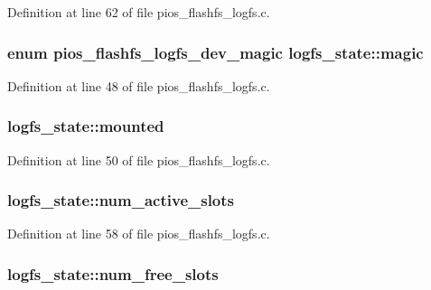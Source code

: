 Definition at line 62 of file pios\-\_\-flashfs\-\_\-logfs.\-c.

\hypertarget{structlogfs__state_acbcddf457808c9af84d6441f4f34be1e}{
\subsubsection[{magic}]{\setlength{\rightskip}{0pt plus 5cm}enum {\bf pios\-\_\-flashfs\-\_\-logfs\-\_\-dev\-\_\-magic} logfs\-\_\-state\-::magic}}\label{structlogfs__state_acbcddf457808c9af84d6441f4f34be1e}


Definition at line 48 of file pios\-\_\-flashfs\-\_\-logfs.\-c.

\hypertarget{structlogfs__state_a5d12393331e2e5d7d9141f4437e09ccf}{
\subsubsection[{mounted}]{ logfs\-\_\-state\-::mounted}}\label{structlogfs__state_a5d12393331e2e5d7d9141f4437e09ccf}


Definition at line 50 of file pios\-\_\-flashfs\-\_\-logfs.\-c.

\hypertarget{structlogfs__state_a9606319a5f23b1dee579106c84bf198b}{
\subsubsection[{num\-\_\-active\-\_\-slots}]{ logfs\-\_\-state\-::num\-\_\-active\-\_\-slots}}\label{structlogfs__state_a9606319a5f23b1dee579106c84bf198b}


Definition at line 58 of file pios\-\_\-flashfs\-\_\-logfs.\-c.

\hypertarget{structlogfs__state_a3c61a652819a886351af3431c8fe2061}{
\subsubsection[{num\-\_\-free\-\_\-slots}]{ logfs\-\_\-state\-::num\-\_\-free\-\_\-slots}}\label{structlogfs__state_a3c61a652819a886351af3431c8fe2061}


